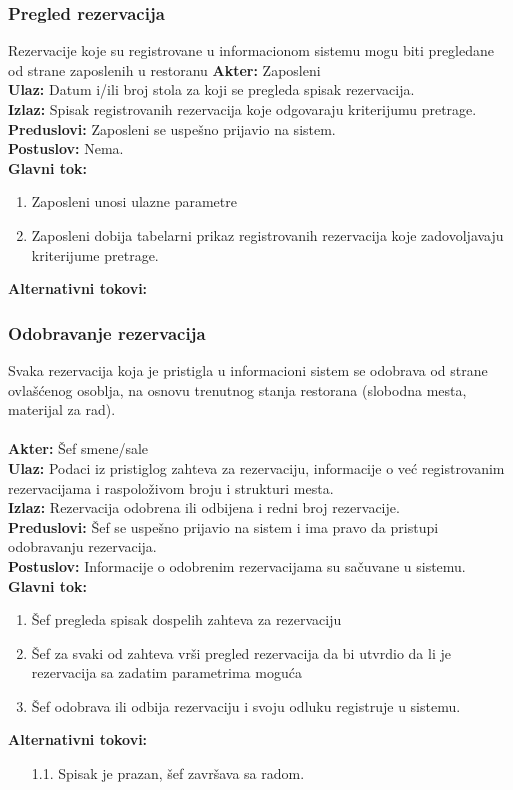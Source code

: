\documentclass{article}
\begin{document}
\subsubsection{Pregled rezervacija}
Rezervacije koje su registrovane u informacionom sistemu mogu biti pregledane od strane zaposlenih u restoranu
\textbf{Akter:} Zaposleni\\
\textbf{Ulaz:} Datum i/ili broj stola za koji se pregleda spisak rezervacija.\\
\textbf{Izlaz:} Spisak registrovanih rezervacija koje odgovaraju kriterijumu pretrage.\\
\textbf{Preduslovi:} Zaposleni se uspešno prijavio na sistem.\\
\textbf{Postuslov:} Nema.\\
\textbf{Glavni tok:}
\begin{enumerate}
\item Zaposleni unosi ulazne parametre
\item Zaposleni dobija tabelarni prikaz registrovanih rezervacija koje zadovoljavaju kriterijume pretrage.\\
\end{enumerate}
\textbf{Alternativni tokovi:} \ \\

\subsubsection{Odobravanje rezervacija}
Svaka rezervacija koja je pristigla u informacioni sistem se odobrava od strane ovlašćenog osoblja, na osnovu trenutnog stanja restorana (slobodna mesta, materijal za rad).\\\\
\textbf{Akter:} Šef smene/sale\\
\textbf{Ulaz:} Podaci iz pristiglog zahteva za rezervaciju, informacije o već registrovanim rezervacijama i raspoloživom broju i strukturi mesta.\\
\textbf{Izlaz:} Rezervacija odobrena ili odbijena i redni broj rezervacije.\\
\textbf{Preduslovi:} Šef se uspešno prijavio na sistem i ima pravo da pristupi odobravanju rezervacija.\\
\textbf{Postuslov:} Informacije o odobrenim rezervacijama su sačuvane u sistemu.\\
\textbf{Glavni tok:}
\begin{enumerate}
\item Šef pregleda spisak dospelih zahteva za rezervaciju
\item Šef za svaki od zahteva vrši pregled rezervacija da bi utvrdio da li je rezervacija sa zadatim parametrima moguća
\item Šef odobrava ili odbija rezervaciju i svoju odluku registruje u sistemu.\\
\end{enumerate}
\textbf{Alternativni tokovi:}\\
\begin{itemize}
\item [1.1.] Spisak je prazan, šef završava sa radom.
\end{itemize}
\end{document}
